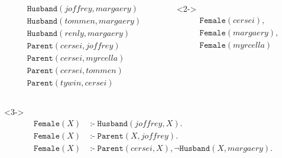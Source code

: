 \documentclass{beamer}
\DeclareMathOperator{\ifff}{:-}
\begin{document}
\begin{frame}
  \begin{columns}
    \begin{column}{0.5\textwidth}
      \begin{alertblock}{}
        \vspace*{-1.5\baselineskip}\setlength\belowdisplayshortskip{0pt}
        \begin{gather*}
          \mathtt{Husband}(\mathit{joffrey}, \mathit{margaery}) \\
          \mathtt{Husband}(\mathit{tommen}, \mathit{margaery}) \\
          \mathtt{Husband}(\mathit{renly}, \mathit{margaery}) \\
          \mathtt{Parent}(\mathit{cersei}, \mathit{joffrey}) \\
          \mathtt{Parent}(\mathit{cersei}, \mathit{myrcella}) \\
          \mathtt{Parent}(\mathit{cersei}, \mathit{tommen}) \\
          \mathtt{Parent}(\mathit{tywin}, \mathit{cersei})
        \end{gather*}
        \vspace*{-1.5\baselineskip}\setlength\belowdisplayshortskip{0pt}
      \end{alertblock}
    \end{column}
    \begin{column}{0.5\textwidth}
      \begin{exampleblock}{}<2->
        \vspace*{-1.5\baselineskip}\setlength\belowdisplayshortskip{0pt}
        \begin{gather*}
          \mathtt{Female}(\mathit{cersei}), \\
          \mathtt{Female}(\mathit{margaery}), \\
          \mathtt{Female}(\mathit{myrcella})
        \end{gather*}
        \vspace*{-1.5\baselineskip}\setlength\belowdisplayshortskip{0pt}
      \end{exampleblock}
    \end{column}
  \end{columns}
  \begin{block}{}<3->
    \vspace*{-1.5\baselineskip}\setlength\belowdisplayshortskip{0pt}
    \begin{align*}
      \mathtt{Female}(X) &\ifff \mathtt{Husband}(\mathit{joffrey}, X). \\
      \mathtt{Female}(X) &\ifff \mathtt{Parent}(X, \mathit{joffrey}). \\
      \mathtt{Female}(X) &\ifff \mathtt{Parent}(\mathit{cersei}, X), \neg\mathtt{Husband}(X, \mathit{margaery}).
    \end{align*}
    \vspace*{-1.5\baselineskip}\setlength\belowdisplayshortskip{0pt}
  \end{block}
\end{frame}
\end{document}
